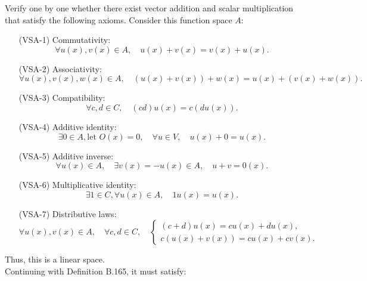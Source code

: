 \documentclass[a4paper]{article}
\begin{document}
Verify one by one whether there exist vector addition and scalar multiplication that satisfy the following axioms.
Consider this function space \( A \):
\begin{enumerate}
    \item[(VSA-1)] Commutativity:
    \[
    \forall u(x), v(x) \in A, \quad u(x) + v(x) = v(x) + u(x).
    \]
    
    \item[(VSA-2)] Associativity:
    \[
    \forall u(x), v(x), w(x) \in A, \quad (u(x) + v(x)) + w(x) = u(x) + (v(x) + w(x)).
    \]
    
    \item[(VSA-3)] Compatibility:
    \[
    \forall c, d \in C, \quad (cd)u(x) = c(du(x)).
    \]
    
    \item[(VSA-4)] Additive identity:
    \[
    \exists 0 \in A, \text{let } O(x)=0, \quad \forall u \in V, \quad u(x) + 0 = u(x).
    \]
    
    \item[(VSA-5)] Additive inverse:
    \[
    \forall u(x) \in A, \quad \exists v(x) = -u(x) \in A, \quad u + v = 0(x).
    \]
    
    \item[(VSA-6)] Multiplicative identity:
    \[
    \exists 1 \in C, \forall u(x) \in A, \quad 1u(x) = u(x).
    \]
    
    \item[(VSA-7)] Distributive laws:
    \[
    \forall u(x), v(x) \in A, \quad \forall c, d \in C, \quad 
    \begin{cases}
        (c+d)u(x) = cu(x) + du(x), \\
        c(u(x) + v(x)) = cu(x) + cv(x).
    \end{cases}
    \]
\end{enumerate}
Thus, this is a linear space. \\
Continuing with Definition B.165, it must satisfy:
\end{document}
